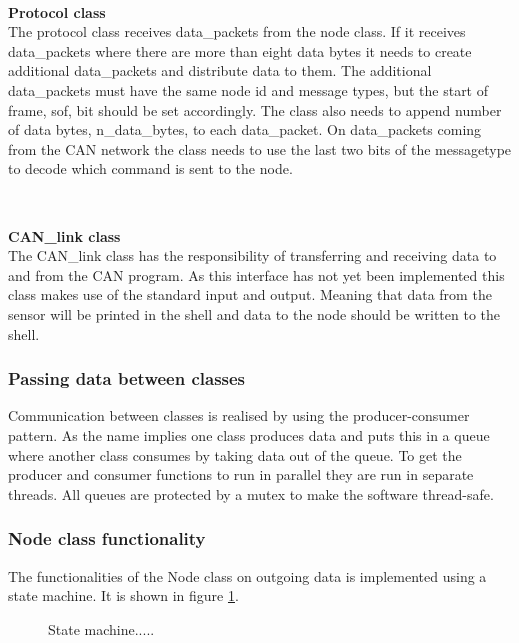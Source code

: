 ~\\ \par \textbf{Protocol class} ~ \\
The protocol class receives data\_packets from the node class. 
If it receives data\_packets where there are more than eight data bytes it needs to create additional data\_packets and distribute data to them. 
The additional data\_packets must have the same node id and message types, but the start of frame, sof, bit should be set accordingly.
The class also needs to append number of data bytes, n\_data\_bytes, to each data\_packet.
On data\_packets coming from the CAN network the class needs to use the last two bits of the messagetype to decode which command is sent to the node.

~\\ \par \textbf{CAN\_link class} ~ \\
The CAN\_link class has the responsibility of transferring and receiving data to and from the CAN program.
As this interface has not yet been implemented this class makes use of the standard input and output. 
Meaning that data from the sensor will be printed in the shell and data to the node should be written to the shell. 

\subsubsection*{Passing data between classes}
Communication between classes is realised by using the producer-consumer pattern.
As the name implies one class produces data and puts this in a queue where another class consumes by taking data out of the queue.
To get the producer and consumer functions to run in parallel they are run in separate threads.
All queues are protected by a mutex to make the software thread-safe.

\subsubsection*{Node class functionality}
The functionalities of the Node class on outgoing data is implemented using a state machine.
It is shown in figure \ref{fig:state_machine}.
\begin{figure}[!h]
\centering
{}
\caption{State machine.....}
\label{fig:state_machine}
\end{figure}



